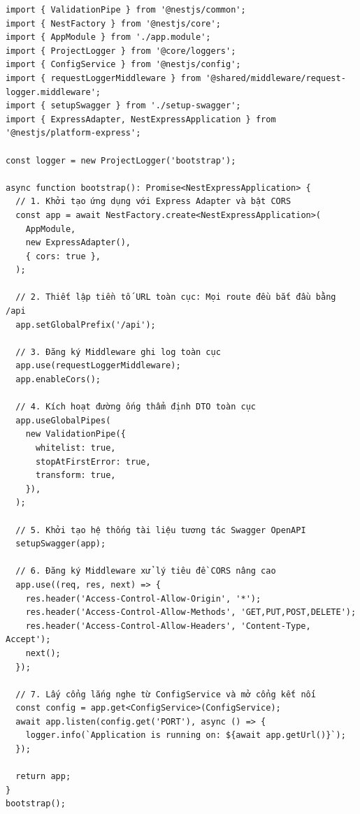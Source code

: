\documentclass[12pt,a4paper,oneside]{book}
\begin{document}
\begin{codebox}
\begin{Verbatim}[fontsize=\small]
import { ValidationPipe } from '@nestjs/common';
import { NestFactory } from '@nestjs/core';
import { AppModule } from './app.module';
import { ProjectLogger } from '@core/loggers';
import { ConfigService } from '@nestjs/config';
import { requestLoggerMiddleware } from '@shared/middleware/request-logger.middleware';
import { setupSwagger } from './setup-swagger';
import { ExpressAdapter, NestExpressApplication } from '@nestjs/platform-express';

const logger = new ProjectLogger('bootstrap');

async function bootstrap(): Promise<NestExpressApplication> {
  // 1. Khởi tạo ứng dụng với Express Adapter và bật CORS
  const app = await NestFactory.create<NestExpressApplication>(
    AppModule,
    new ExpressAdapter(),
    { cors: true },
  );

  // 2. Thiết lập tiền tố URL toàn cục: Mọi route đều bắt đầu bằng /api
  app.setGlobalPrefix('/api');

  // 3. Đăng ký Middleware ghi log toàn cục
  app.use(requestLoggerMiddleware);
  app.enableCors();

  // 4. Kích hoạt đường ống thẩm định DTO toàn cục
  app.useGlobalPipes(
    new ValidationPipe({
      whitelist: true,
      stopAtFirstError: true,
      transform: true,
    }),
  );

  // 5. Khởi tạo hệ thống tài liệu tương tác Swagger OpenAPI
  setupSwagger(app);

  // 6. Đăng ký Middleware xử lý tiêu đề CORS nâng cao
  app.use((req, res, next) => {
    res.header('Access-Control-Allow-Origin', '*');
    res.header('Access-Control-Allow-Methods', 'GET,PUT,POST,DELETE');
    res.header('Access-Control-Allow-Headers', 'Content-Type, Accept');
    next();
  });

  // 7. Lấy cổng lắng nghe từ ConfigService và mở cổng kết nối
  const config = app.get<ConfigService>(ConfigService);
  await app.listen(config.get('PORT'), async () => {
    logger.info(`Application is running on: ${await app.getUrl()}`);
  });

  return app;
}
bootstrap();
\end{Verbatim}
\end{codebox}
\end{document}
